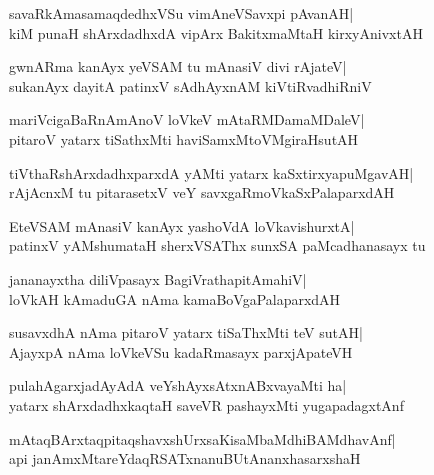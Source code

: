 \documentclass[twoside,12pt,openright]{book}
\newcounter{shloka}[chapter]
\begin{document}
\begin{shloka}%
savaRkAmasamaqdedhxVSu vimAneVSavxpi pAvanAH|\\
kiM punaH shArxdadhxdA vipArx BakitxmaMtaH kirxyAnivxtAH
\end{shloka}

\begin{shloka}%
gwnARma kanAyx yeVSAM tu mAnasiV divi rAjateV|\\
sukanAyx dayitA patinxV sAdhAyxnAM kiVtiRvadhiRniV
\end{shloka}

\begin{shloka}%
mariVcigaBaRnAmAnoV loVkeV mAtaRMDamaMDaleV|\\
pitaroV yatarx tiSathxMti haviSamxMtoVMgiraHsutAH
\end{shloka}

\begin{shloka}%
tiVthaRshArxdadhxparxdA yAMti yatarx kaSxtirxyapuMgavAH|\\
rAjAcnxM tu pitarasetxV veY savxgaRmoVkaSxPalaparxdAH
\end{shloka}

\begin{shloka}%
EteVSAM mAnasiV kanAyx yashoVdA loVkavishurxtA|\\
patinxV yAMshumataH sherxVSAThx sunxSA paMcadhanasayx tu
\end{shloka}

\begin{shloka}%
jananayxtha diliVpasayx BagiVrathapitAmahiV|\\
loVkAH kAmaduGA nAma kamaBoVgaPalaparxdAH
\end{shloka}

\begin{shloka}%
susavxdhA nAma pitaroV yatarx tiSaThxMti teV sutAH|\\
AjayxpA nAma loVkeVSu kadaRmasayx parxjApateVH
\end{shloka}

\begin{shloka}%
pulahAgarxjadAyAdA veYshAyxsAtxnABxvayaMti ha|\\
yatarx shArxdadhxkaqtaH saveVR pashayxMti yugapadagxtAnf
\end{shloka}

\begin{shloka}%
mAtaqBArxtaqpitaqshavxshUrxsaKisaMbaMdhiBAMdhavAnf|\\
api janAmxMtareYdaqRSATxnanuBUtAnanxhasarxshaH
\end{shloka}
\end{document}
